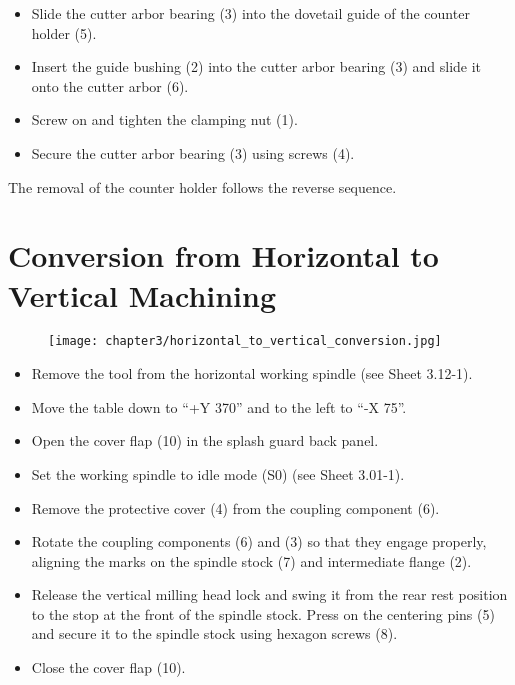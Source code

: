 \begin{itemize}
    \item Slide the cutter arbor bearing (3) into the dovetail guide of the counter holder (5).
    \item Insert the guide bushing (2) into the cutter arbor bearing (3) and slide it onto the cutter arbor (6).
    \item Screw on and tighten the clamping nut (1).
    \item Secure the cutter arbor bearing (3) using screws (4).
\end{itemize}

The removal of the counter holder follows the reverse sequence.\footnotemark

\vspace{0.3cm}


\section{Conversion from Horizontal to Vertical Machining}
\setcounter{section}{7}

\begin{figure}[h]
    \centering
    \texttt{[image: chapter3/horizontal\_to\_vertical\_conversion.jpg]}
    \label{fig:horizontal_to_vertical_conversion}
\end{figure}

\vspace{0.3cm}

\begin{itemize}
    \item Remove the tool from the horizontal working spindle (see Sheet 3.12-1).
    \item Move the table down to \enquote{+Y 370} and to the left to \enquote{-X 75}.\footnotemark
    \item Open the cover flap (10) in the splash guard back panel.
    \item Set the working spindle to idle mode (S0) (see Sheet 3.01-1).
    \item Remove the protective cover (4) from the coupling component (6).
    \item Rotate the coupling components (6) and (3) so that they engage properly, aligning the marks on the spindle stock (7) and intermediate flange (2).
    \item Release the vertical milling head lock and swing it from the rear rest position to the stop at the front of the spindle stock. Press on the centering pins (5) and secure it to the spindle stock using hexagon screws (8).
    \item Close the cover flap (10).
\end{itemize}

